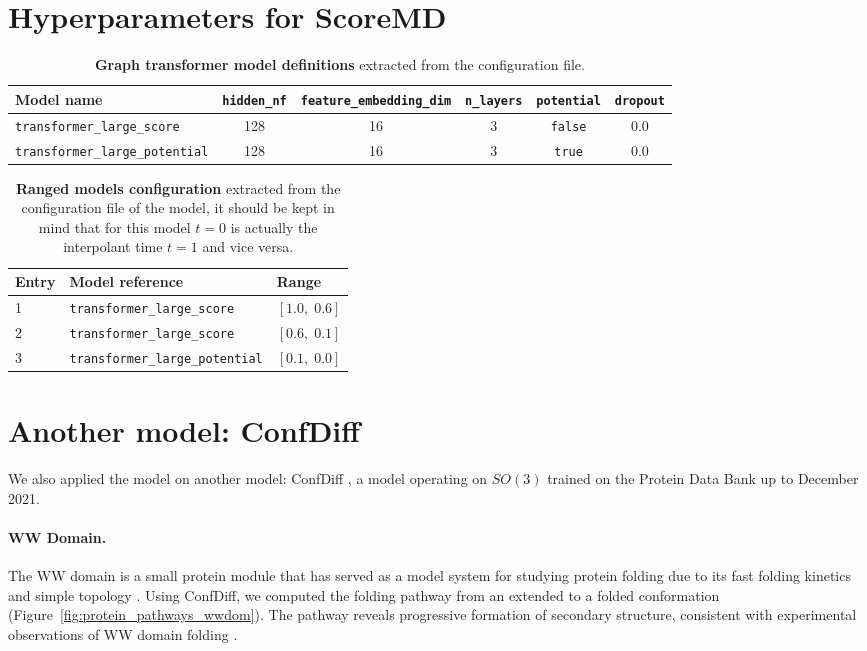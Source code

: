 \documentclass{article}
\theoremstyle{plain}
\theoremstyle{definition}
\theoremstyle{remark}
\begin{document}
\section{Hyperparameters for ScoreMD}
\label{app:scoreMD}

\begin{table}[h]
\centering
\caption{\textbf{Graph transformer model definitions} extracted from the configuration file.}
\label{tab:model_definitions}
\begin{tabular}{lccccc}
\hline
\textbf{Model name} & \textbf{\texttt{hidden\_nf}} & \textbf{\texttt{feature\_embedding\_dim}} & \textbf{\texttt{n\_layers}} & \textbf{\texttt{potential}} & \textbf{\texttt{dropout}} \\
\hline
\texttt{transformer\_large\_score}     & 128 & 16 & 3 & \texttt{false} & 0.0 \\
\texttt{transformer\_large\_potential} & 128 & 16 & 3 & \texttt{true}  & 0.0 \\
\hline
\end{tabular}
\end{table}

\begin{table}[h]
\centering
\caption{\textbf{Ranged models configuration} extracted from the configuration file of the model, it should be kept in mind that for this model $t=0$ is actually the interpolant time $t=1$ and vice versa.}
\label{tab:ranged_models}
\begin{tabular}{lll}
\hline
\textbf{Entry} & \textbf{Model reference} & \textbf{Range} \\
\hline
1 & \texttt{transformer\_large\_score}     & $[1.0,\;0.6]$ \\
2 & \texttt{transformer\_large\_score}     & $[0.6,\;0.1]$ \\
3 & \texttt{transformer\_large\_potential} & $[0.1,\;0.0]$ \\
\hline
\end{tabular}
\end{table}

\newpage

\section{Another model: ConfDiff}
\label{app:confdiff}

We also applied the model on another model: ConfDiff \citep{wang2024confdiff}, a model operating on $SO(3)$ trained on the Protein Data Bank up to December 2021.

\paragraph{WW Domain.} The WW domain is a small protein module that has served as a model system for studying protein folding due to its fast folding kinetics and simple topology \citep{jager2006structure}. Using ConfDiff, we computed the folding pathway from an extended to a folded conformation (Figure~\ref{fig:protein_pathways_wwdom}). The pathway reveals progressive formation of secondary structure, consistent with experimental observations of WW domain folding \citep{liu2008desolvation}.
\end{document}
